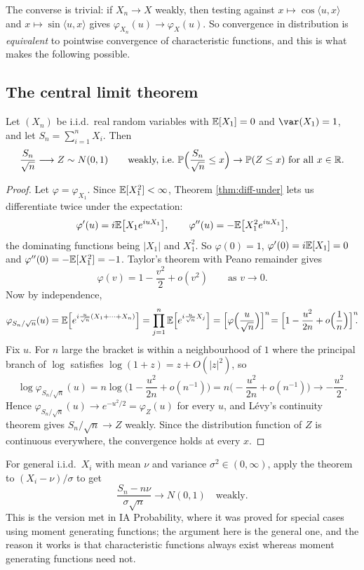 \documentclass[a4paper]{scrartcl}
\newcommand{\ip}[2]{\langle #1, #2 \rangle}
\begin{document}
The converse is trivial: if $X_n \to X$ weakly, then testing against $x \mapsto \cos\ip{u}{x}$ and $x\mapsto\sin\ip{u}{x}$ gives $\varphi_{X_n}(u)\to\varphi_X(u)$. So convergence in distribution is \emph{equivalent} to pointwise convergence of characteristic functions, and this is what makes the following possible.

\subsection{The central limit theorem}

\begin{theorem}\label{thm:clt}
	Let $(X_n)$ be i.i.d.\ real random variables with $\mathbb{E}[X_1]=0$ and $\var(X_1)=1$, and let $S_n = \sum_{i=1}^n X_i$. Then
	$$
	\frac{S_n}{\sqrt n} \longrightarrow Z \sim N(0,1) \qquad \text{weakly, i.e.\ } \mathbb{P}\Big(\frac{S_n}{\sqrt n}\leq x\Big)\to\mathbb{P}(Z \leq x) \text{ for all } x \in \mathbb{R}.
	$$
\end{theorem}
\begin{proof}
	Let $\varphi = \varphi_{X_1}$. Since $\mathbb{E}[X_1^2]<\infty$, Theorem \ref{thm:diff-under} lets us differentiate twice under the expectation:
	$$
	\varphi'(u)=i\mathbb{E}\big[X_1e^{iuX_1}\big], \qquad \varphi''(u)=-\mathbb{E}\big[X_1^2e^{iuX_1}\big],
	$$
	the dominating functions being $|X_1|$ and $X_1^2$. So $\varphi(0)=1$, $\varphi'(0)=i\mathbb{E}[X_1]=0$ and $\varphi''(0)=-\mathbb{E}[X_1^2]=-1$. Taylor's theorem with Peano remainder gives
	$$
	\varphi(v) = 1 - \frac{v^2}{2}+o(v^2) \qquad \text{as } v \to 0.
	$$
	Now by independence,
	$$
	\varphi_{S_n/\sqrt n}(u) = \mathbb{E}\Big[e^{i\frac{u}{\sqrt n}(X_1+\cdots+X_n)}\Big]=\prod_{j=1}^n\mathbb{E}\Big[e^{i\frac{u}{\sqrt n}X_j}\Big]=\Big[\varphi\Big(\frac{u}{\sqrt n}\Big)\Big]^n\! = \Big[1 - \frac{u^2}{2n}+o\Big(\frac1n\Big)\Big]^n\!\!.
	$$
	Fix $u$. For $n$ large the bracket is within a neighbourhood of $1$ where the principal branch of $\log$ satisfies $\log(1+z)=z+O(|z|^2)$, so
	$$
	\log \varphi_{S_n/\sqrt n}(u) = n\log\Big(1-\frac{u^2}{2n}+o(n^{-1})\Big) = n\Big(-\frac{u^2}{2n}+o(n^{-1})\Big)\longrightarrow -\frac{u^2}{2}.
	$$
	Hence $\varphi_{S_n/\sqrt n}(u)\to e^{-u^2/2}=\varphi_Z(u)$ for every $u$, and L\'evy's continuity theorem gives $S_n/\sqrt n \to Z$ weakly. Since the distribution function of $Z$ is continuous everywhere, the convergence holds at every $x$.
\end{proof}

\begin{remark}
	For general i.i.d.\ $X_i$ with mean $\nu$ and variance $\sigma^2 \in(0,\infty)$, apply the theorem to $(X_i-\nu)/\sigma$ to get
	$$
	\frac{S_n - n\nu}{\sigma\sqrt n}\longrightarrow N(0,1) \quad \text{weakly.}
	$$
	This is the version met in IA Probability, where it was proved for special cases using moment generating functions; the argument here is the general one, and the reason it works is that characteristic functions always exist whereas moment generating functions need not.
\end{remark}
\end{document}

